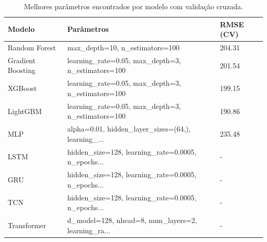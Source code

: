 \begin{table}
\centering
\caption{Melhores parâmetros encontrados por modelo com validação cruzada.}
\label{tab:parametros_otimizados}
\begin{tabular}{lll}
\toprule
           Modelo &                                         Parâmetros & RMSE (CV) \\
\midrule
    Random Forest &                     max_depth=10, n_estimators=100 &    204.31 \\
Gradient Boosting &  learning_rate=0.05, max_depth=3, n_estimators=100 &    201.54 \\
          XGBoost &  learning_rate=0.05, max_depth=3, n_estimators=100 &    199.15 \\
         LightGBM &  learning_rate=0.05, max_depth=3, n_estimators=100 &    190.86 \\
              MLP & alpha=0.01, hidden_layer_sizes=(64,), learning_... &    235.48 \\
             LSTM & hidden_size=128, learning_rate=0.0005, n_epochs... &         - \\
              GRU & hidden_size=128, learning_rate=0.0005, n_epochs... &         - \\
              TCN & hidden_size=128, learning_rate=0.0005, n_epochs... &         - \\
      Transformer & d_model=128, nhead=8, num_layers=2, learning_ra... &         - \\
\bottomrule
\end{tabular}
\end{table}
